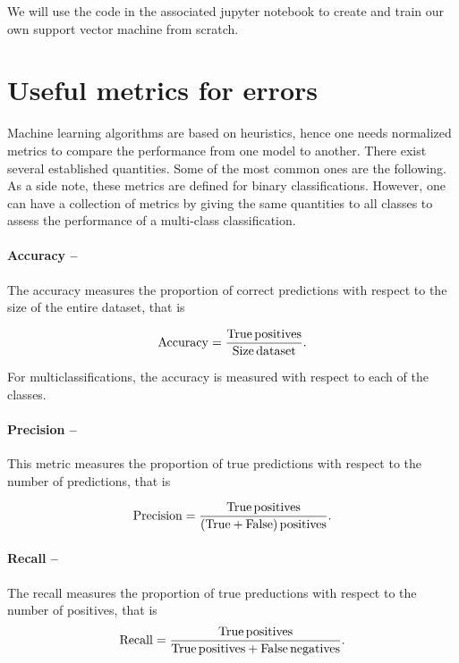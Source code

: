 \documentclass[]{report}
\begin{document}
We will use the code in the associated jupyter notebook to create and train our own support vector machine from scratch. 

\section{Useful metrics for errors}\label{sec.error-metrics}

Machine learning algorithms are based on heuristics, hence one needs normalized metrics to compare the performance from one model to another. There exist several established quantities. Some of the most common ones are the following. As a side note, these metrics are defined for binary classifications. However, one can have a collection of metrics by giving the same quantities to all classes to assess the performance of a multi-class classification. 

\paragraph{Accuracy --} The accuracy measures the proportion of correct predictions with respect to the size of the entire dataset, that is

\begin{equation}
{\rm Accuracy} = \frac{\rm True \, positives}{\rm Size\, dataset}. 
\end{equation}

For multiclassifications, the accuracy is measured with respect to each of the classes. 

\paragraph{Precision --} This metric measures the proportion of true predictions with respect to the number of predictions, that is

\begin{equation}
{\rm Precision} = \frac{\rm True \, positives}{\rm (True+False) \, positives}. 
\end{equation}

\paragraph{Recall --} The recall measures the proportion of true preductions with respect to the number of positives, that is
\begin{equation}
{\rm Recall} = \frac{\rm True \, positives}{\rm True \, positives + False \, negatives}. 
\end{equation}
\end{document}
